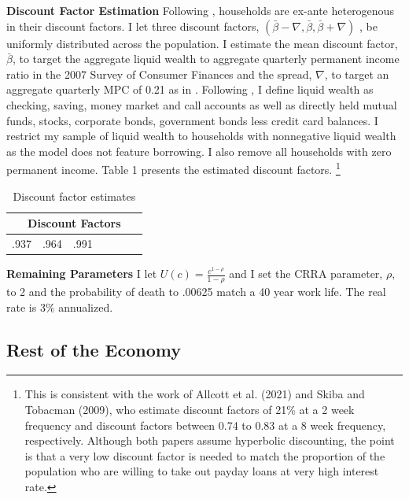 \textbf{Discount Factor Estimation}  Following \cite{carroll2017distribution}, households are ex-ante heterogenous in their discount factors. I let three discount factors, $(\bar{\beta} - \nabla, \bar{\beta} , \bar{\beta} + \nabla)$ , be uniformly distributed across the population. I estimate the mean discount factor, $\bar{\beta}$, to target the aggregate liquid wealth to aggregate quarterly permanent income ratio in the 2007 Survey of Consumer Finances and the spread, $\nabla$, to target an aggregate quarterly MPC of 0.21 as in \cite{kekre2023}. Following \cite{Kaplan_Brookings}, I define liquid wealth as checking, saving, money market and call accounts as well as directly held mutual funds, stocks, corporate bonds, government bonds less credit card balances. I restrict my sample of liquid wealth to households with nonnegative liquid wealth as the model does not feature borrowing.  I also remove all households with zero permanent income. Table 1 presents the estimated discount factors. \footnote{This is consistent with the work of Allcott et al. (2021) and Skiba and Tobacman (2009), who estimate discount factors  of 21\% at a 2 week frequency and discount factors between 0.74 to 0.83 at a 8 week frequency, respectively. Although both papers assume hyperbolic discounting, the point is that a very low discount factor is needed to match the proportion of the population who are willing to take out payday loans at very high interest rate. }

\begin{table}[H]
\begin{center}\renewcommand{\arraystretch}{2.0}
\caption{Discount factor estimates}\label{table:DiscFacEstimation}
\begin{tabular}{ccccccc}
\hline
      \multicolumn{7}{c}{ Discount Factors }    \\ \hline
   .937   & .964 &   .991 \\   
 \hline
\end{tabular}
\end{center}
\end{table}

\textbf{Remaining Parameters} I let $U(c) = \frac{ c ^ { 1-\rho } } {1-\rho}$ and I set the CRRA parameter, $\rho$, to 2 and the probability of death to .00625 match a 40 year work life. The real rate is $3\%$ annualized.

\subsection{Rest of the Economy }

